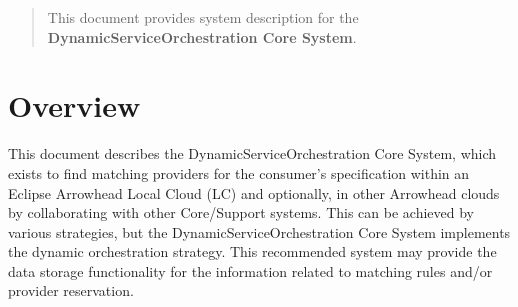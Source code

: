 \documentclass[a4paper]{arrowhead}
\begin{document}
\ArrowheadDate{\today}
\ArrowheadSetup

\begin{center}
  \vspace*{1cm}
  \huge{\arrowtitle}

  \vspace*{0.2cm}
  \LARGE{\arrowtype}
  \vspace*{1cm}

  \vspace*{\fill}


  \vspace*{1cm}
  \vspace*{\fill}

  \begin{abstract}
    This document provides system description for the \textbf{DynamicServiceOrchestration Core System}.
  \end{abstract}

  \vspace*{1cm}

 \end{center}

\newpage

\tableofcontents
\newpage

\section{Overview}
\label{sec:overview}
\color{black}
This document describes the DynamicServiceOrchestration Core System, which exists to find matching providers for the consumer's specification within an Eclipse Arrowhead Local Cloud (LC) and optionally, in other Arrowhead clouds by collaborating with other Core/Support systems. This can be achieved by various strategies, but the DynamicServiceOrchestration Core System implements the dynamic orchestration strategy. This recommended system may provide the data storage functionality for the information related to matching rules and/or provider reservation.
\end{document}
